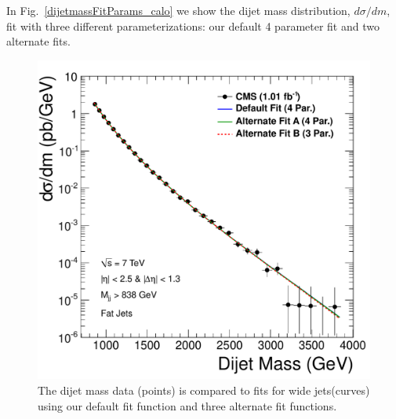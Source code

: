  
In Fig.~\ref{dijetmassFitParams_calo} we show the dijet mass distribution,
$d\sigma/dm$, fit with three different parameterizations: our default
4 parameter fit and two alternate fits.

\begin{figure}[!ht]
  \begin{center}
        \includegraphics[width=\textwidth]
                        {Figures/DijetMass_withFit_All_fat.pdf}
    \caption{ 
The dijet mass data (points) is compared to fits for wide jets(curves)
using our default fit function and three alternate fit functions.}
    \label{dijetmassFitParams_wide}
  \end{center}
\end{figure}

